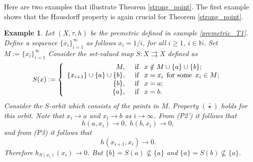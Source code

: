 \documentclass{article}
\renewcommand{\emptyset}{\varnothing}
\def\text#1{\,\;\hbox{#1}\;\,}
\newcommand{\N}{\mathbb{N}}
\newtheorem{rem}[theo]{Remark}
\newtheorem{examp}[theo]{Example}
\begin{document}

 Here are two examples that illustrate Theorem \ref{strong_point}. The first example shows that the Hausdorff property is again crucial for Theorem \ref{strong_point}.

\begin{examp} Let $(X ,\tau, h)$ be the premetric defined in example \ref{premetric_T1}. Define a sequence $\{x_i\}^{\infty}_{i=1}$ as follows $x_i=1/i$, for all $i \geq 1$, $i \in \N$. Set $M:=\{x_i\}^{\infty}_{i=1}$ Consider the set-valued map $S:X \rightrightarrows X$ defined as
\[
S(x):= \left \{\begin{array}{rl} M, & \text{if } x \notin M \cup \{a\} \cup \{b\};  \\
\{x_{i+1}\} \cup \{a\}\cup  \{b\}, & \text{if } x = x_{i} \text{for some} x_{i}  \in M; \\
\{b\}, & \text{if } x=a;\\
\{a\}, & \text{if } x=b.\end{array}\right.
\]
Consider the $S$-orbit which consists of the points in $M$. Property $(\bar{\star})$ holds for this orbit. Note that $x_i \rightarrow a$ and $x_i \rightarrow b$ as $i \rightarrow \infty$. From (P2') it follows that
\[h(a,x_i) \rightarrow 0, \; h(b,x_i) \rightarrow 0,\] and from (P3) it follows that \[h(x_{i+1},x_i) \rightarrow 0.\]
Therefore $h_{S(x_{i})}(x_{i}) \rightarrow 0$. But $\{b\}=S(a) \nsubseteq \{a\}$ and $\{a\}=S(b) \nsubseteq \{a\}$.
\end{examp}
 
\end{document}
